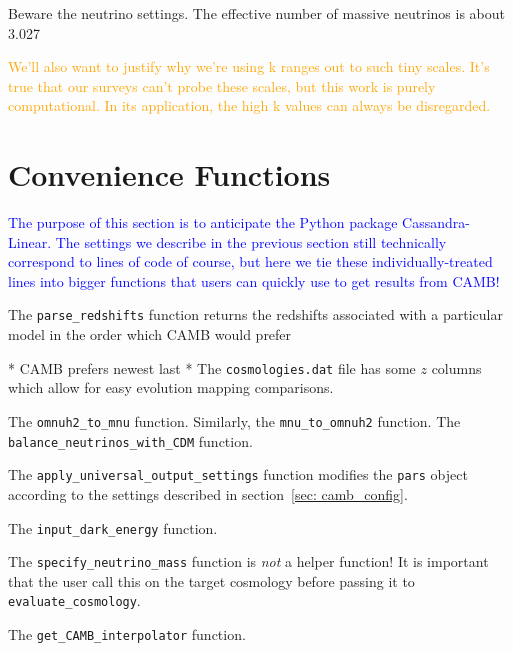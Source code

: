 Beware the neutrino settings. The effective number of massive neutrinos is about 3.027


\textcolor{orange}{We'll also want to justify why we're using k ranges out to
such tiny scales. It's true that our surveys can't probe these scales, but
this work is purely computational. In its application, the high k values can
always be disregarded.}

\section{Convenience Functions}


\textcolor{blue}{The purpose of this section is to anticipate the Python
package Cassandra-Linear. The settings we describe in the previous section
still technically correspond to lines of code of course, but here we tie these
individually-treated lines into bigger functions that users can quickly use to
get results from CAMB!}



The \verb|parse_redshifts| function returns the redshifts associated with a
particular model in the order which CAMB would prefer

* CAMB prefers newest last
* The \verb|cosmologies.dat| file has some $z$ columns which allow for easy
evolution mapping comparisons. %
	

The \verb|omnuh2_to_mnu| function. Similarly, the \verb|mnu_to_omnuh2|
function. The \verb|balance_neutrinos_with_CDM| function.


The \verb|apply_universal_output_settings| function modifies the \verb|pars|
object according to the settings described in section~\ref{sec: camb_config}.

The \verb|input_dark_energy| function.

The \verb|specify_neutrino_mass| function is \textit{not} a helper function!
It is important that the user call this on the target cosmology before passing
it to \verb|evaluate_cosmology|.

The \verb|get_CAMB_interpolator| function.


